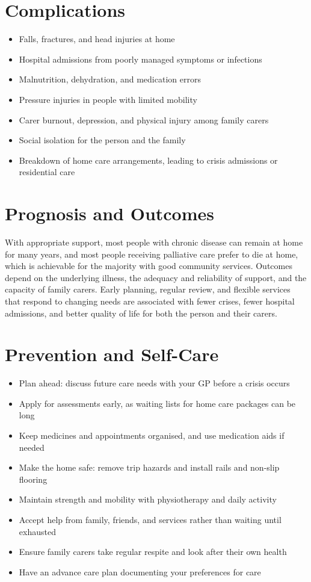 \section*{Complications}
\begin{itemize}
    \item Falls, fractures, and head injuries at home
    \item Hospital admissions from poorly managed symptoms or infections
    \item Malnutrition, dehydration, and medication errors
    \item Pressure injuries in people with limited mobility
    \item Carer burnout, depression, and physical injury among family carers
    \item Social isolation for the person and the family
    \item Breakdown of home care arrangements, leading to crisis admissions or residential care
\end{itemize}

\section*{Prognosis and Outcomes}
With appropriate support, most people with chronic disease can remain at home for many years, and most people receiving palliative care prefer to die at home, which is achievable for the majority with good community services. Outcomes depend on the underlying illness, the adequacy and reliability of support, and the capacity of family carers. Early planning, regular review, and flexible services that respond to changing needs are associated with fewer crises, fewer hospital admissions, and better quality of life for both the person and their carers.

\section*{Prevention and Self-Care}
\begin{itemize}
    \item Plan ahead: discuss future care needs with your GP before a crisis occurs
    \item Apply for assessments early, as waiting lists for home care packages can be long
    \item Keep medicines and appointments organised, and use medication aids if needed
    \item Make the home safe: remove trip hazards and install rails and non-slip flooring
    \item Maintain strength and mobility with physiotherapy and daily activity
    \item Accept help from family, friends, and services rather than waiting until exhausted
    \item Ensure family carers take regular respite and look after their own health
    \item Have an advance care plan documenting your preferences for care
\end{itemize}

